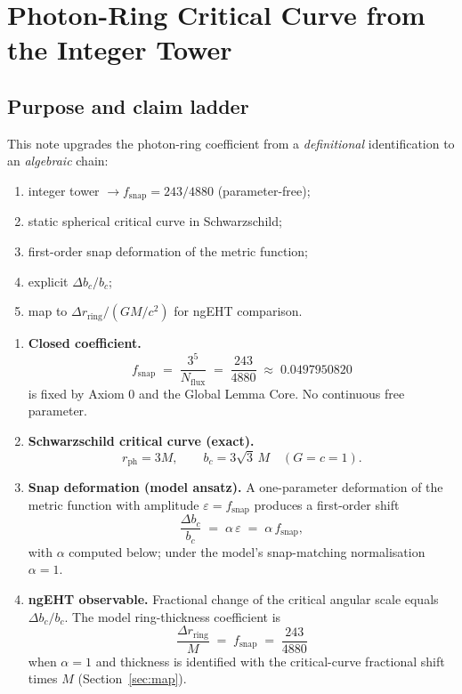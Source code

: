 
\chapter{Photon-Ring Critical Curve from the Integer Tower}
\label{ch:photon-ring}

\section{Purpose and claim ladder}

This note upgrades the photon-ring coefficient from a \emph{definitional}
identification to an \emph{algebraic} chain:
\begin{enumerate}[label=(\roman*)]
  \item integer tower \(\to f_{\mathrm{snap}}=243/4880\) (parameter-free);
  \item static spherical critical curve in Schwarzschild;
  \item first-order snap deformation of the metric function;
  \item explicit \(\Delta b_c/b_c\);
  \item map to \(\Delta r_{\mathrm{ring}}/(GM/c^2)\) for ngEHT comparison.
\end{enumerate}

\begin{theorem}
\label{thm:ring-ladder}
\begin{enumerate}[label=(\Alph*)]
  \item \textbf{Closed coefficient.}
  \[
  f_{\mathrm{snap}}
  \;=\;
  \frac{3^5}{N_{\mathrm{flux}}}
  \;=\;
  \frac{243}{4880}
  \;\approx\; 0.0497950820
  \]
  is fixed by Axiom 0 and the Global Lemma Core. No continuous free parameter.
  \item \textbf{Schwarzschild critical curve (exact).}
  \[
  r_{\mathrm{ph}}=3M,\qquad
  b_c=3\sqrt{3}\,M
  \quad(G=c=1).
  \]
  \item \textbf{Snap deformation (model ansatz).}
  A one-parameter deformation of the metric function with amplitude
  \(\varepsilon=f_{\mathrm{snap}}\) produces a first-order shift
  \[
  \frac{\Delta b_c}{b_c}
  \;=\;
  \alpha\,\varepsilon
  \;=\;
  \alpha\,f_{\mathrm{snap}},
  \]
  with \(\alpha\) computed below; under the model's snap-matching normalisation
  \(\alpha=1\).
  \item \textbf{ngEHT observable.}
  Fractional change of the critical angular scale equals \(\Delta b_c/b_c\).
  The model ring-thickness coefficient is
  \[
  \frac{\Delta r_{\mathrm{ring}}}{M}
  \;=\;
  f_{\mathrm{snap}}
  \;=\;
  \frac{243}{4880}
  \]
  when \(\alpha=1\) and thickness is identified with the critical-curve
  fractional shift times \(M\) (Section~\ref{sec:map}).
\end{enumerate}
\end{theorem}

